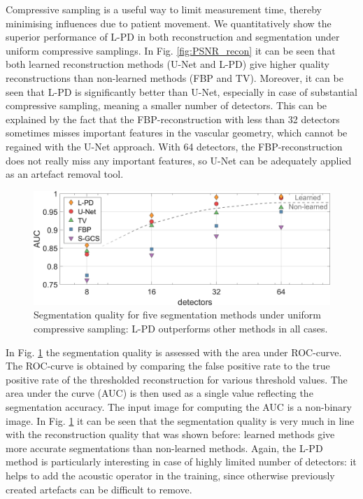 \documentclass[journal]{IEEEtran}
\begin{document}
Compressive sampling is a useful way to limit measurement time, thereby minimising influences due to patient movement. We quantitatively show the superior performance of L-PD in both reconstruction and segmentation under uniform compressive samplings. In Fig. \ref{fig:PSNR_recon} it can be seen that both learned reconstruction methods (U-Net and L-PD) give higher quality reconstructions than non-learned methods (FBP and TV). Moreover, it can be seen that L-PD is significantly better than U-Net, especially in case of substantial compressive sampling, meaning a smaller number of detectors. This can be explained by the fact that the FBP-reconstruction with less than 32 detectors sometimes misses important features in the vascular geometry, which cannot be regained with the U-Net approach. With 64 detectors, the FBP-reconstruction does not really miss any important features, so U-Net can be adequately applied as an artefact removal tool.  

{
\begin{figure}[ht!]
\centering
\includegraphics[width=\linewidth]{images/Paper_resultsuniform_AUC.png}
\caption{Segmentation quality for five segmentation methods under uniform compressive sampling: L-PD outperforms other methods in all cases.}
\label{fig:AUC_recon}
\end{figure}
}

In Fig. \ref{fig:AUC_recon} the segmentation quality is assessed with the area under ROC-curve. The ROC-curve is obtained by comparing the false positive rate to the true positive rate of the thresholded reconstruction for various threshold values. The area under the curve (AUC) is then used as a single value reflecting the segmentation accuracy. The input image for computing the AUC is a non-binary image. In Fig. \ref{fig:AUC_recon} it can be seen that the segmentation quality is very much in line with the reconstruction quality that was shown before: learned methods give more accurate segmentations than non-learned methods. Again, the L-PD method is particularly interesting in case of highly limited number of detectors: it helps to add the acoustic operator in the training, since otherwise previously created artefacts can be difficult to remove.
\end{document}
